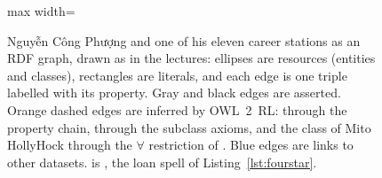 \begin{figure}[t]
\centering
\begin{adjustbox}{max width=\textwidth}

\end{adjustbox}
\caption{Nguyễn Công Phượng and one of his eleven career stations as an RDF graph,
drawn as in the lectures: ellipses are resources (entities and classes), rectangles
are literals, and each edge is one triple labelled with its property. Gray and
black edges are asserted. Orange dashed edges are inferred by OWL~2~RL:
 through the property chain,  through the
subclass axioms, and the class of Mito HollyHock through the $\forall$ restriction of
. Blue edges are  links to other datasets.
 is , the loan spell of
Listing~\ref{lst:fourstar}.}
\label{fig:example}
\end{figure}
